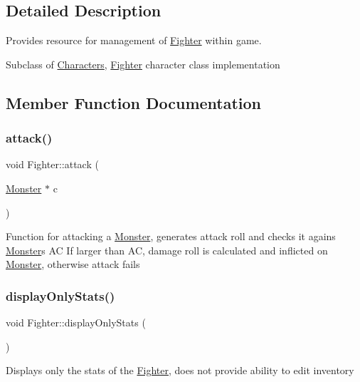 \subsection{Detailed Description}
Provides resource for management of \hyperlink{class_fighter}{Fighter} within game. 

Subclass of \hyperlink{class_characters}{Characters}, \textquotesingle{}\hyperlink{class_fighter}{Fighter}\textquotesingle{} character class implementation 

\subsection{Member Function Documentation}
\hypertarget{class_fighter_ac1a886e2f60333e38e90fff2a0f6107b}{}\label{class_fighter_ac1a886e2f60333e38e90fff2a0f6107b} 
\subsubsection{\texorpdfstring{attack()}{attack()}}
{\footnotesize\ttfamily void Fighter\+::attack (\begin{DoxyParamCaption}\item[{\hyperlink{class_monster}{Monster} $\ast$}]{c }\end{DoxyParamCaption})}

Function for attacking a \hyperlink{class_monster}{Monster}, generates attack roll and checks it agains \hyperlink{class_monster}{Monster}\textquotesingle{}s AC If larger than AC, damage roll is calculated and inflicted on \hyperlink{class_monster}{Monster}, otherwise attack fails \hypertarget{class_fighter_a5dd8b95b965832bbae65d6285a9bac53}{}\label{class_fighter_a5dd8b95b965832bbae65d6285a9bac53} 
\subsubsection{\texorpdfstring{display\+Only\+Stats()}{displayOnlyStats()}}
{\footnotesize\ttfamily void Fighter\+::display\+Only\+Stats (\begin{DoxyParamCaption}{ }\end{DoxyParamCaption})}

Displays only the stats of the \hyperlink{class_fighter}{Fighter}, does not provide ability to edit inventory \hypertarget{class_fighter_acabd4955401ddf3ddc0be5f28fa64267}{}\label{class_fighter_acabd4955401ddf3ddc0be5f28fa64267} 
